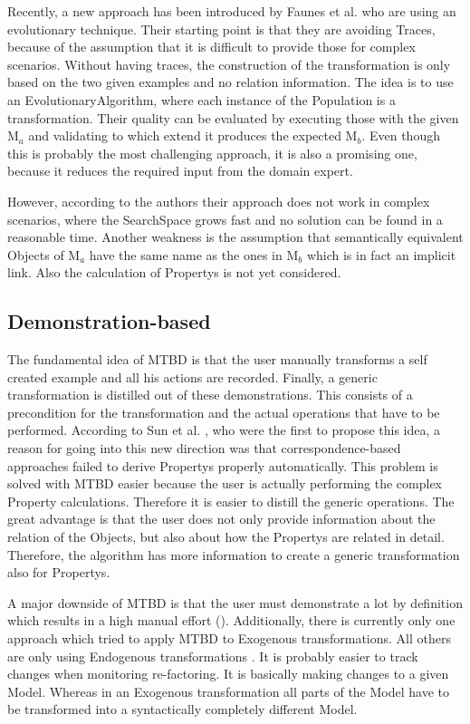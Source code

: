 Recently, a new approach has been introduced by Faunes et al. \cite{Faunes2013} who are using an evolutionary technique. Their starting point is that they are avoiding \glspl{Trace}, because of the assumption that it is difficult to provide those for complex scenarios. Without having traces, the construction of the transformation is only based on the two given examples and no relation information. The idea is to use an \gls{EvolutionaryAlgorithm}, where each instance of the \gls{Population} is a transformation. Their quality can be evaluated by executing those with the given M$_a$ and validating to which extend it produces the expected M$_b$. Even though this is probably the most challenging approach, it is also a promising one, because it reduces the required input from the domain expert. 

However, according to the authors their approach does not work in complex scenarios, where the \gls{SearchSpace} grows fast and no solution can be found in a reasonable time. Another weakness is the assumption that semantically equivalent \glspl{Object} of M$_a$ have the same name as the ones in M$_b$ which is in fact an implicit link. Also the calculation of \glspl{Property} is not yet considered. 

\subsection{Demonstration-based}

The fundamental idea of MTBD is that the user manually transforms a self created example and all his actions are recorded. Finally, a generic transformation is distilled out of these demonstrations. This consists of a precondition for the transformation and the actual operations that have to be performed.
According to Sun et al. \cite{Sun2009}, who were the first to propose this idea, a reason for going into this new direction was that correspondence-based approaches failed to derive \glspl{Property} properly automatically. This problem is solved with MTBD easier because the user is actually performing the complex \gls{Property} calculations. Therefore it is easier to distill the generic operations. The great advantage is that the user does not only provide information about the relation of the \glspl{Object}, but also about how the \glspl{Property} are related in detail. Therefore, the algorithm has more information to create a generic transformation also for \glspl{Property}.

A major downside of MTBD is that the user must demonstrate a lot by definition which results in a high manual effort (\cite{Kessentini2010a}). Additionally, there is currently only one approach which tried to apply MTBD to \gls{Exogenous} transformations. All others are only using \gls{Endogenous} transformations \cite{Kappel2012}. It is probably easier to track changes when monitoring re-factoring. It is basically making changes to a given \gls{Model}. Whereas in an \gls{Exogenous} transformation all parts of the \gls{Model} have to be transformed into a syntactically completely different \gls{Model}.

